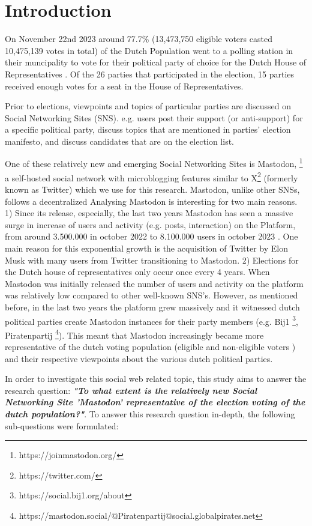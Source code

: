 \section{Introduction}

On November  22nd 2023 around 77.7\% (13,473,750 eligible voters casted 10,475,139 votes in total) of the Dutch Population went to a polling station in their muncipality to vote for their political party of choice for the Dutch House of Representatives \cite{kies}. Of the 26 parties that participated in the election, 15 parties received enough votes for a seat in the House of Representatives.

Prior to elections, viewpoints and topics of particular parties are discussed on Social Networking Sites (SNS). e.g. users post their support (or anti-support) for a specific political party, discuss topics that are mentioned in parties' election manifesto, and discuss candidates that are on the election list.

One of these relatively new and emerging Social Networking Sites is Mastodon, \footnote{https://joinmastodon.org/} a self-hosted social network with microblogging features similar to X\footnote{https://twitter.com/} (formerly known as Twitter) which we use for this research. Mastodon, unlike other SNSs, follows a decentralized Analysing Mastodon is interesting for two main reasons. 1) Since its release, especially, the last two years Mastodon has seen a massive surge in increase of users and activity (e.g. posts, interaction) on the Platform, from around 3.500.000 in october 2022 to 8.100.000 users in october 2023 \cite{analytics}. One main reason for this exponential growth is the acquisition of Twitter by Elon Musk \cite{musk} with many users from Twitter transitioning to Mastodon. 2) Elections for the Dutch house of representatives only occur once every 4 years. When Mastodon was initially released the number of users and activity on the platform was relatively low compared to other well-known SNS's. However, as mentioned before, in the last two years the platform grew massively and it witnessed dutch political parties create Mastodon instances for their party members (e.g. Bij1 \footnote{https://social.bij1.org/about}, Piratenpartij \footnote{https://mastodon.social/@Piratenpartij@social.globalpirates.net}). This meant that Mastodon increasingly became more representative of the dutch voting population (eligible and non-eligible voters ) and their respective viewpoints about the various dutch political parties. 

In order to investigate this social web related topic, this study aims to answer the research question:
\textbf{\textit{"To what extent is the relatively new Social Networking Site 'Mastodon' representative of the election voting of the dutch population?"}}. To answer this research question in-depth, the following sub-questions were formulated:

